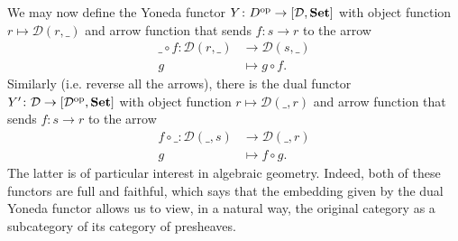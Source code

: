 \documentclass[10pt]{amsart}
\begin{document}
  We may now define the Yoneda functor $Y \colon D^\text{op} \rightarrow [\mathcal{D}, {\bf Set}]$ with object function $r \mapsto \mathcal{D}(r, \_)$ and arrow function that sends $f \colon s \rightarrow r$ to the arrow
  \begin{align*}
    \_ \circ f \colon \mathcal{D}(r, \_) &\rightarrow \mathcal{D}(s, \_)\\
   g & \mapsto g \circ f.
  \end{align*}
  Similarly (i.e. reverse all the arrows), there is the dual functor $Y^\prime \colon \mathcal{D} \rightarrow [\mathcal{D}^\text{op}, {\bf Set}]$ with object function $r \mapsto \mathcal{D}(\_, r)$ and arrow function that sends $f \colon s \rightarrow r$ to the arrow
  \begin{align*}
    f \circ \_  \colon \mathcal{D}(\_, s)  &\rightarrow \mathcal{D}(\_, r)\\
   g & \mapsto f \circ g.
  \end{align*}
  The latter is of particular interest in algebraic geometry.
  Indeed, both of these functors are full and faithful, which says that the embedding given by the dual Yoneda functor allows us to view, in a natural way, the original category as a subcategory of its category of presheaves.
  
  
  {}
\end{document}
